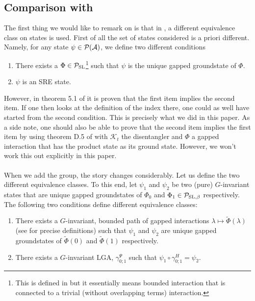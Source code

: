 \documentclass[11pt,a4paper,twoside]{article}
\numberwithin{equation}{section}
\begin{document}
	\subsection{Comparison with \texorpdfstring{\cite{ogata2021h3gmathbb}}{}}\label{sec:SomeRemarks}
	The first thing we would like to remark on is that in \cite{ogata2021h3gmathbb}, a different equivalence class on states is used. First of all the set of states considered is a priori different. Namely, for any state $\psi\in \mathcal P(\mathcal A)$, we define two different conditions
	\begin{enumerate}
		\item There exists a $\Phi\in\mathcal P_{\text{SL}}$\footnote{This is defined in \cite{ogata2021h3gmathbb} but it essentially means bounded interaction that is connected to a trivial (without overlapping terms) interaction.} such that $\psi$ is the unique gapped groundstate of $\Phi$.
		\item $\psi$ is an SRE state.
	\end{enumerate}
	However, in theorem 5.1 of \cite{ogata2021h3gmathbb} it is proven that the first item implies the second item. If one then looks at the definition of the index there, one could as well have started from the second condition. This is precisely what we did in this paper. As a side note, one should also be able to prove that the second item implies the first item by using theorem D.5 of \cite{ogata2021h3gmathbb} with $\mathcal{K}_t$ the disentangler and $\Phi$ a gapped interaction that has the product state as its ground state. However, we won't work this out explicitly in this paper.\\\\
	When we add the group, the story changes considerably. Let us define the two different equivalence classes. To this end, let $\psi_1$ and $\psi_2$ be two (pure) $G$-invariant states that are unique gapped groundstates of $\Phi_0$ and $\Phi_1\in\mathcal P_{\text{SL},\beta}$ respectively. The following two conditions define different equivalence classes:
	\begin{enumerate}
		\item There exists a $G$-invariant, bounded path of gapped interactions $\lambda\mapsto\tilde\Phi(\lambda)$ (see \cite{ogata2021h3gmathbb} for precise definitions) such that $\psi_1$ and $\psi_2$ are unique gapped groundstates of $\tilde{\Phi}(0)$ and $\tilde{\Phi}(1)$ respectively.
		\item There exists a $G$-invariant LGA, $\gamma^\Psi_{0;1}$ such that $\psi_1\circ\gamma^H_{0;1}=\psi_2$.
	\end{enumerate}
\end{document}
